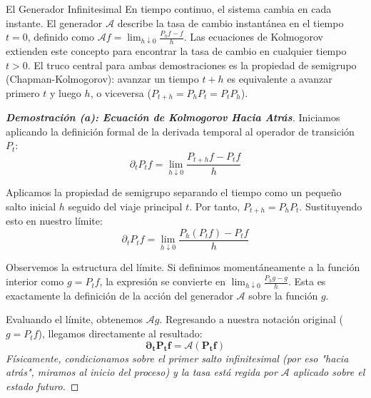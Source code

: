 \documentclass[10pt,a4paper]{article}
\begin{document}
\vspace{2mm}

\begin{nota}{El Generador Infinitesimal}
    En tiempo continuo, el sistema cambia en cada instante. El generador $\mathcal{A}$ describe la tasa de cambio instantánea en el tiempo $t=0$, definido como $\mathcal{A}f = \lim_{h \downarrow 0} \frac{P_h f - f}{h}$.
    Las ecuaciones de Kolmogorov extienden este concepto para encontrar la tasa de cambio en cualquier tiempo $t>0$. El truco central para ambas demostraciones es la propiedad de semigrupo (Chapman-Kolmogorov): avanzar un tiempo $t+h$ es equivalente a avanzar primero $t$ y luego $h$, o viceversa ($P_{t+h} = P_h P_t = P_t P_h$).
\end{nota}

\vspace{5mm}

\begin{proof}[\textbf{Demostración (a): Ecuación de Kolmogorov Hacia Atrás}]
    Iniciamos aplicando la definición formal de la derivada temporal al operador de transición $P_t$:
    \[ \partial_t P_t f = \lim_{h \downarrow 0} \frac{P_{t+h} f - P_t f}{h} \]

    Aplicamos la propiedad de semigrupo separando el tiempo como un pequeño salto inicial $h$ seguido del viaje principal $t$. Por tanto, $P_{t+h} = P_h P_t$. Sustituyendo esto en nuestro límite:
    \[ \partial_t P_t f = \lim_{h \downarrow 0} \frac{P_h (P_t f) - P_t f}{h} \]

    Observemos la estructura del límite. Si definimos momentáneamente a la función interior como $g = P_t f$, la expresión se convierte en $\lim_{h \downarrow 0} \frac{P_h g - g}{h}$.
    Esta es exactamente la definición de la acción del generador $\mathcal{A}$ sobre la función $g$.
    
    Evaluando el límite, obtenemos $\mathcal{A}g$. Regresando a nuestra notación original ($g = P_t f$), llegamos directamente al resultado:
    \[ \mathbf{\partial_t P_t f = \mathcal{A} (P_t f)} \]
    \textit{Físicamente, condicionamos sobre el primer salto infinitesimal (por eso "hacia atrás", miramos al inicio del proceso) y la tasa está regida por $\mathcal{A}$ aplicado sobre el estado futuro.}
\end{proof}

\newpage
\end{document}
